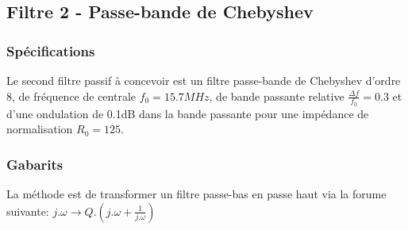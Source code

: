 \subsection{Filtre 2 - Passe-bande de Chebyshev}
\begin{itemize}
    \subsubsection{Spécifications}
        \begin{flushleft}
            Le second filtre passif à concevoir est un filtre passe-bande de Chebyshev d'ordre 8, de fréquence de centrale $f_0=15.7MHz$, de bande passante relative $\frac{\Delta f}{f_0} = 0.3$ et d'une ondulation de 0.1dB dans la bande passante pour une impédance de normalisation $R_0=125${\Omega}.
        \end{flushleft}
    \subsubsection{Gabarits}
    \begin{flushleft}
        La méthode est de transformer un filtre passe-bas en passe haut via la forume suivante:
        $j.\omega \rightarrow Q.(j.\omega+\frac{1}{j. \omega})$
    \end{flushleft}
    

\end{itemize}
